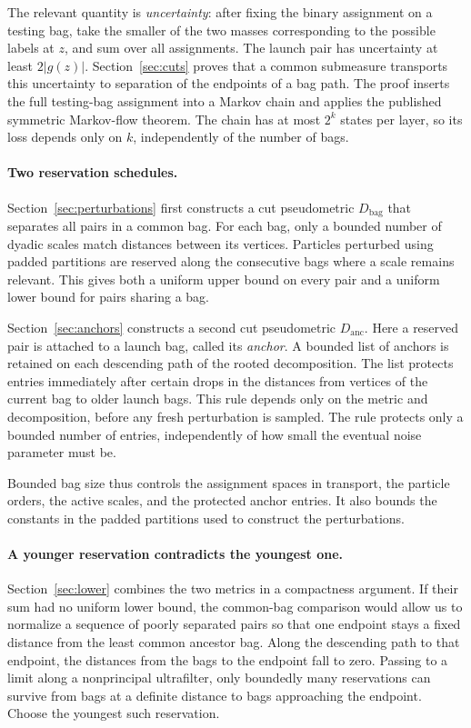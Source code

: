 The relevant quantity is \emph{uncertainty}: after fixing the binary
assignment on a testing bag, take the smaller of the two masses
corresponding to the possible labels at $z$, and sum over all
assignments. The launch pair has uncertainty at least $2|g(z)|$.
Section~\ref{sec:cuts} proves that a common submeasure transports
this uncertainty to separation of the endpoints of a bag path.
The proof inserts the full testing-bag assignment into a Markov
chain and applies the published symmetric Markov-flow theorem.
The chain has at most $2^k$ states per layer, so its loss depends
only on $k$, independently of the number of bags.

\paragraph{Two reservation schedules.}
Section~\ref{sec:perturbations} first constructs a cut pseudometric
$D_{\mathrm{bag}}$ that separates all pairs in a common bag. For
each bag, only a bounded number of dyadic scales match distances
between its vertices. Particles perturbed using padded partitions
are reserved along the consecutive bags where a scale remains
relevant. This gives both a uniform upper bound on every pair and
a uniform lower bound for pairs sharing a bag.

Section~\ref{sec:anchors} constructs a second cut pseudometric
$D_{\mathrm{anc}}$. Here a reserved pair is attached to a launch
bag, called its \emph{anchor}. A bounded list of anchors is retained
on each descending path of the rooted decomposition. The list
protects entries immediately after certain drops in the distances
from vertices of the current bag to older launch bags. This rule
depends only on the metric and decomposition, before any fresh
perturbation is sampled. The rule protects only a bounded number
of entries, independently of how small the eventual noise parameter
must be.

Bounded bag size thus controls the assignment spaces in transport,
the particle orders, the active scales, and the protected anchor
entries. It also bounds the constants in the padded partitions used
to construct the perturbations.

\paragraph{A younger reservation contradicts the youngest one.}
Section~\ref{sec:lower} combines the two metrics in a compactness
argument. If their sum had no uniform lower bound, the common-bag
comparison would allow us to normalize a sequence of poorly
separated pairs so that one endpoint stays a fixed distance from
the least common ancestor bag. Along the descending path to that
endpoint, the distances from the bags to the endpoint fall to zero.
Passing to a limit along a nonprincipal ultrafilter, only boundedly
many reservations can survive from bags at a definite distance to
bags approaching the endpoint. Choose the youngest such reservation.

